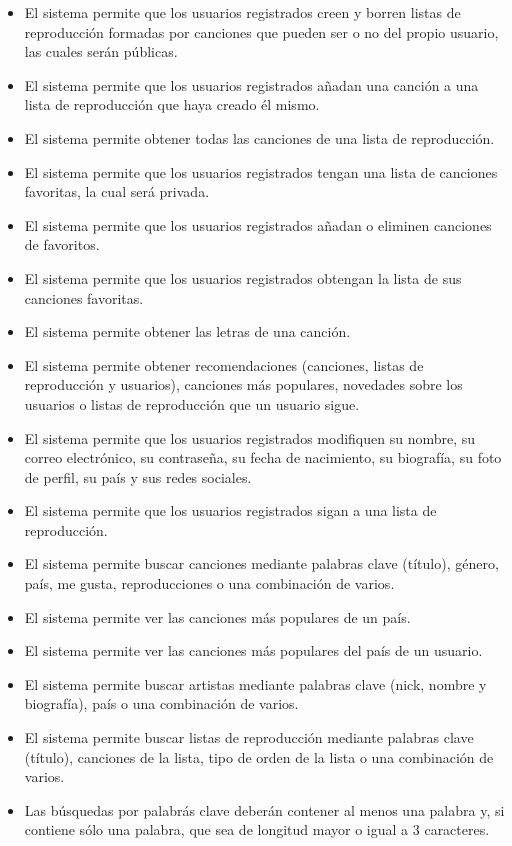 \documentclass[12pt]{article}%
\begin{document}
\begin{itemize}
	\item El sistema permite que los usuarios registrados creen y borren listas de reproducci\'on formadas por canciones que pueden ser o no del propio usuario, las cuales ser\'an p\'ublicas.
	\item El sistema permite que los usuarios registrados a\~nadan una canci\'on a una lista de reproducci\'on que haya creado \'el mismo.
	\item El sistema permite obtener todas las canciones de una lista de reproducci\'on.

	\item El sistema permite que los usuarios registrados tengan una lista de canciones favoritas, la cual será privada.
	\item El sistema permite que los usuarios registrados añadan o eliminen canciones de favoritos.
	\item El sistema permite que los usuarios registrados obtengan la lista de sus canciones favoritas.
	\item El sistema permite obtener las letras de una canci\'on.
	
	\item El sistema permite obtener recomendaciones (canciones, listas de reproducción y usuarios), canciones más populares, novedades sobre los usuarios o listas de reproducción que un usuario sigue. 
	
	\item El sistema permite que los usuarios registrados modifiquen su nombre, su correo electr\'onico, su contrase\~na, su fecha de nacimiento, su biograf\'ia, su foto de perfil, su pa\'is y sus redes sociales.
	\item El sistema permite que los usuarios registrados sigan a una lista de reproducci\'on.
	\item El sistema permite buscar canciones mediante palabras clave (t\'itulo), g\'enero, pa\'is, me gusta, reproducciones o una combinaci\'on de varios.
	\item El sistema permite ver las canciones más populares de un pa\'is.
	\item El sistema permite ver las canciones más populares del pa\'is de un usuario.
	
	\item El sistema permite buscar artistas mediante palabras clave (nick, nombre y biograf\'ia), pa\'is o una combinaci\'on de varios.
	\item El sistema permite buscar listas de reproducci\'on mediante palabras clave (t\'itulo), canciones de la lista, tipo de orden de la lista o una combinaci\'on de varios.
	
	\item Las b\'usquedas por palabr\'as clave deber\'an contener al menos una palabra y, si contiene s\'olo una palabra, que sea de longitud mayor o igual a 3 caracteres.

\end{itemize}
\end{document}
